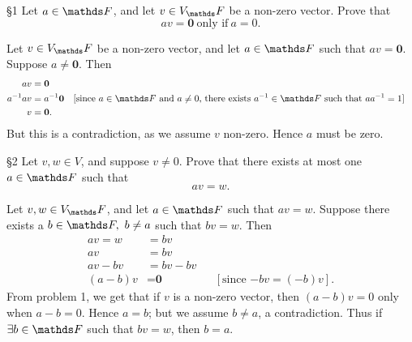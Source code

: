 \documentclass{homework}
\begin{document}
\begin{problem}{\S 1}
  Let $a\in \F$, and let $v\in V_\F$ be a non-zero vector. Prove that \[
    av=\textbf{0} ~\text{only if}~ a=0
  .\] 
\end{problem}

\begin{solution}
  Let $v\in V_\F$ be a non-zero vector, and let $a\in \F$ such that $av=\textbf{0}$. Suppose $ a\neq
  \textbf{0}$. Then
  \begin{align*}
    av &= \textbf{0} \\
    a^{-1}av&= a^{-1}\textbf{0} && [\text{since $a\in \F$ and $a\neq 0$, there exists $a^{-1}\in
    \F$ such that $aa^{-1}=1$}] \\
    v&= \textbf{0}
  .\end{align*} But this is a contradiction, as we assume $v$ non-zero. Hence $a$ must be zero.
\end{solution}


\begin{problem}{\S 2}
  Let $v,w\in V$, and suppose $v\neq 0$. Prove that there exists at most one  $a\in \F$ such that \[
    av = w
  .\] 
\end{problem}

\begin{solution}
  Let $v,w\in V_\F$, and let $a\in \F$ such that $av=w$. Suppose there exists a $b\in \F,\ b\neq a$
  such that $bv=w$. Then
  \begin{align*}
    av = w &= bv \\
    av &= bv \\
    av - bv &= bv - bv \\
    (a-b)v &= \textbf{0} && [\text{since $-bv=(-b)v$}]
  .\end{align*}
  From problem 1, we get that if $v$ is a non-zero vector, then $(a-b)v=0$ only when $a-b=0$. Hence
  $a=b$; but we assume $b\neq a$, a contradiction. Thus if $\exists b\in \F$ such that $bv=w$, then
  $b=a$.
\end{solution}
\end{document}
